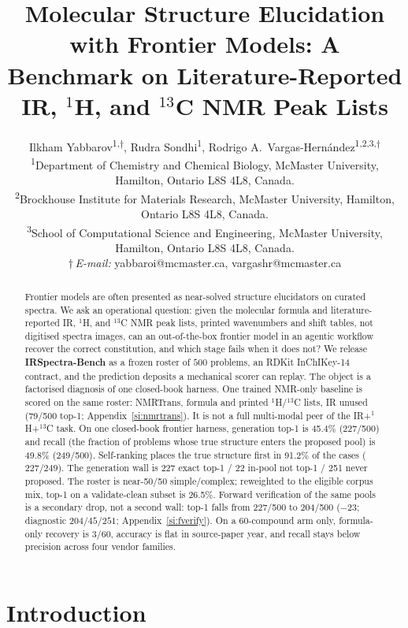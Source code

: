 \documentclass{article}
\title{Molecular Structure Elucidation with Frontier Models: A Benchmark on Literature-Reported IR, $^1$H, and $^{13}$C NMR Peak Lists}
\author{
Ilkham Yabbarov\textsuperscript{1,$\dagger$},
Rudra Sondhi\textsuperscript{1},
Rodrigo A.\ Vargas-Hern\'andez\textsuperscript{1,2,3,$\dagger$}\\
\textsuperscript{1}Department of Chemistry and Chemical Biology, McMaster University,
Hamilton, Ontario L8S 4L8, Canada.\\
\textsuperscript{2}Brockhouse Institute for Materials Research, McMaster University,
Hamilton, Ontario L8S 4L8, Canada.\\
\textsuperscript{3}School of Computational Science and Engineering, McMaster University,
Hamilton, Ontario L8S 4L8, Canada.\\
$\dagger$\,\textit{E-mail:} yabbaroi@mcmaster.ca, vargashr@mcmaster.ca
}
\begin{document}
\maketitle
{}

\begin{abstract}
Frontier models are often presented as near-solved structure elucidators on
curated spectra.
We ask an operational question: given the molecular formula and
literature-reported IR, $^1$H, and $^{13}$C NMR peak lists,
printed wavenumbers and shift tables, not digitised spectra images,
can an out-of-the-box frontier model in an agentic workflow recover the correct constitution, and
which stage fails when it does not?
We release \textbf{IRSpectra-Bench} as a frozen roster of
$500$ problems, an RDKit InChIKey-14 contract, and the
prediction deposits a mechanical scorer can replay.
The object is a factorised diagnosis of one closed-book harness.
One trained NMR-only baseline is scored on the same roster: NMRTrans,
formula and printed $^1$H/$^{13}$C lists, IR unused (79/500 top-1; Appendix~\ref{si:nmrtrans}).
It is not a full multi-modal peer of the IR+$^1$H+$^{13}$C task.
On one closed-book frontier harness, generation top-1 is 45.4\%
(227/500) and recall (the fraction of problems whose true structure enters the proposed pool) is 49.8\% (249/500).
Self-ranking places the true structure first in 91.2\% of the cases ($227/249$).
The generation wall is
227 exact top-1 / 22 in-pool not top-1 / 251 never proposed.
The roster is near-50/50 simple/complex; reweighted to the eligible corpus
mix, top-1 on a validate-clean subset is 26.5\%.
Forward verification of the same pools is a secondary drop, not a second wall:
top-1 falls from 227/500 to 204/500 ($-23$;
diagnostic $204/45/251$; Appendix~\ref{si:fverify}).
On a 60-compound arm only, formula-only recovery is 3/60, accuracy is flat
in source-paper year, and recall stays below precision across four vendor
families.
\end{abstract}

\section{Introduction}
\label{sec:introduction}
\end{document}
